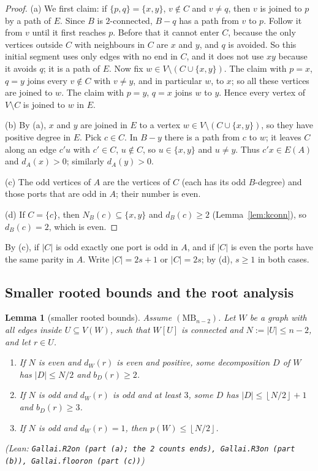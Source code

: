 \documentclass[11pt]{amsart}
\newtheorem{lemma}[theorem]{Lemma}
\theoremstyle{definition}
\theoremstyle{remark}
\renewcommand{\_}{\oldunderscore\allowbreak}
\newcommand{\leanst}[1]{\par{\raggedright\small\textup{(Lean: \texttt{#1})}\par}}
\newcommand{\fl}[1]{\left\lfloor #1\right\rfloor}
\newcommand{\MBU}{\mathrm{MB}}
\begin{document}
\begin{proof}
(a) We first claim: if $\{p,q\}=\{x,y\}$, $v\notin C$ and $v\ne q$, then $v$ is joined to $p$ by a
path of $E$. Since $B$ is $2$-connected, $B-q$ has a path from $v$ to $p$. Follow it from $v$ until
it first reaches $p$. Before that it cannot enter $C$, because the only vertices outside $C$ with
neighbours in $C$ are $x$ and $y$, and $q$ is avoided. So this initial segment uses only edges with
no end in $C$, and it does not use $xy$ because it avoids $q$; it is a path of $E$. Now fix
$w\in V\setminus(C\cup\{x,y\})$. The claim with $p=x$, $q=y$ joins every $v\notin C$ with $v\ne y$,
and in particular $w$, to $x$; so all these vertices are joined to $w$. The claim with $p=y$, $q=x$
joins $w$ to $y$. Hence every vertex of $V\setminus C$ is joined to $w$ in $E$.

(b) By (a), $x$ and $y$ are joined in $E$ to a vertex $w\in V\setminus(C\cup\{x,y\})$, so they have positive degree in $E$. Pick
$c\in C$. In $B-y$ there is a path from $c$ to $w$; it leaves $C$ along an edge $c'u$ with $c'\in C$,
$u\notin C$, so $u\in\{x,y\}$ and $u\ne y$. Thus $c'x\in E(A)$ and $d_A(x)>0$; similarly $d_A(y)>0$.

(c) The odd vertices of $A$ are the vertices of $C$ (each has its odd $B$-degree) and those ports
that are odd in $A$; their number is even.

(d) If $C=\{c\}$, then $N_B(c)\subseteq\{x,y\}$ and $d_B(c)\ge2$ (Lemma~\ref{lem:kconn}), so
$d_B(c)=2$, which is even.
\end{proof}

By (c), if $|C|$ is odd exactly one port is odd in $A$, and if $|C|$ is even the ports have the same
parity in $A$. Write $|C|=2s+1$ or $|C|=2s$; by (d), $s\ge1$ in both cases.

\subsection{Smaller rooted bounds and the root analysis}

\begin{lemma}[smaller rooted bounds]\label{lem:small}
Assume $(\MBU_{n-2})$. Let $W$ be a graph with all edges inside $U\subseteq V(W)$, such that $W[U]$
is connected and $N:=|U|\le n-2$, and let $r\in U$.
\begin{enumerate}[label=\textup{(\alph*)}]
\item If $N$ is even and $d_W(r)$ is even and positive, some decomposition $D$ of $W$ has
$|D|\le N/2$ and $b_D(r)\ge2$.
\item If $N$ is odd and $d_W(r)$ is odd and at least $3$, some $D$ has $|D|\le\fl{N/2}+1$ and
$b_D(r)\ge3$.
\item If $N$ is odd and $d_W(r)=1$, then $p(W)\le\fl{N/2}$.
\end{enumerate}
\leanst{Gallai.R2\_on (part (a); the 2 counts ends), Gallai.R3\_on (part (b)), Gallai.floor\_on (part (c))}
\end{lemma}
\end{document}
